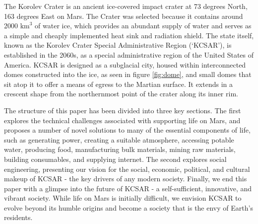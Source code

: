 \documentclass[fleqn,10pt]{Stylesheet} %
\begin{document}
The Korolev Crater is an ancient ice-covered impact crater at 73 degrees North, 163 degrees East on Mars. The Crater was selected because it contains around 2000 $\text{km}^{3}$ of water ice, which provides an abundant supply of water and serves as a simple and cheaply implemented heat sink and radiation shield. The state itself, known as the Korolev Crater Special Administrative Region (`KCSAR'), is established in the 2060s, as a special administrative region of the United States of America. KCSAR is designed as a subglacial city, housed within interconnected domes constructed into the ice, as seen in figure \ref{fig:dome}, and small domes that sit atop it to offer a means of egress to the Martian surface. It extends in a crescent shape from the northernmost point of the crater along its inner rim.

The structure of this paper has been divided into three key sections. The first explores the technical challenges associated with supporting life on Mars, and proposes a number of novel solutions to many of the essential components of life, such as generating power, creating a suitable atmosphere, accessing potable water, producing food, manufacturing bulk materials, mining raw materials, building consumables, and supplying internet. The second explores social engineering, presenting our vision for the social, economic, political, and cultural makeup of KCSAR - the key drivers of any modern society. Finally, we end this paper with a glimpse into the future of KCSAR - a self-sufficient, innovative, and vibrant society. While life on Mars is initially difficult, we envision KCSAR to evolve beyond its humble origins and become a society that is the envy of Earth's residents. 
\end{document}
